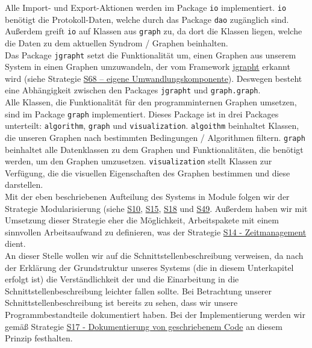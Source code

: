\documentclass[enabledeprecatedfontcommands,fontsize=11pt,paper=a4,twoside]{scrartcl}
\newcounter{one}
\begin{document}
	Alle Import- und Export-Aktionen werden im Package \texttt{io} implementiert. \texttt{io} benötigt die Protokoll-Daten, welche durch das Package \texttt{dao} zugänglich sind. Außerdem greift \texttt{io} auf Klassen aus \texttt{graph} zu, da dort die Klassen liegen, welche die Daten zu dem aktuellen Syndrom / Graphen beinhalten. \\
	
	Das Package \texttt{jgrapht} setzt die Funktionalität um, einen Graphen aus unserem System in einen Graphen umzuwandeln, der vom Framework \hyperlink{xxx}{jgrapht} erkannt wird (siehe Strategie \hyperlink{umwandlungskomponente}{S68 – eigene Umwandlungskomponente}). Deswegen besteht eine Abhängigkeit zwischen den Packages \texttt{jgrapht} und \texttt{graph.graph}. \\
	
	Alle Klassen, die Funktionalität für den programminternen Graphen umsetzen, sind im Package \texttt{graph} implementiert. Dieses Package ist in drei Packages unterteilt: \texttt{algorithm}, \texttt{graph} und \texttt{visualization}. \texttt{algoithm} beinhaltet Klassen, die unseren Graphen nach bestimmten Bedingungen / Algorithmen filtern. \texttt{graph} beinhaltet alle Datenklassen zu dem Graphen und Funktionalitäten, die benötigt werden, um den Graphen umzusetzen. \texttt{visualization} stellt Klassen zur Verfügung, die die visuellen Eigenschaften des Graphen bestimmen und diese darstellen. \\
	
	Mit der eben beschriebenen Aufteilung des Systems in Module folgen wir der Strategie Modularisierung (siehe \hyperlink{aadd}{S10}, \hyperlink{aabb}{S15}, \hyperlink{aacc}{S18} und \hyperlink{aaaa}{S49}. Außerdem haben wir mit Umsetzung dieser Strategie eher die Möglichkeit, Arbeitspakete mit einem sinnvollen Arbeitsaufwand zu definieren, was der Strategie \hyperlink{zeitmanagement}{S14 - Zeitmanagement} dient. \\
	
	An dieser Stelle wollen wir auf die Schnittstellenbeschreibung verweisen, da nach der Erklärung der Grundstruktur unseres Systems (die in diesem Unterkapitel erfolgt ist) die Verständlichkeit der und die Einarbeitung in die Schnittstellenbeschreibung leichter fallen sollte. Bei Betrachtung unserer Schnittstellenbeschreibung ist bereits zu sehen, dass wir unsere Programmbestandteile dokumentiert haben. Bei der Implementierung werden wir gemäß Strategie \hyperlink{aaad}{S17 - Dokumentierung von geschriebenem Code} an diesem Prinzip festhalten. \\
	
\end{document}
